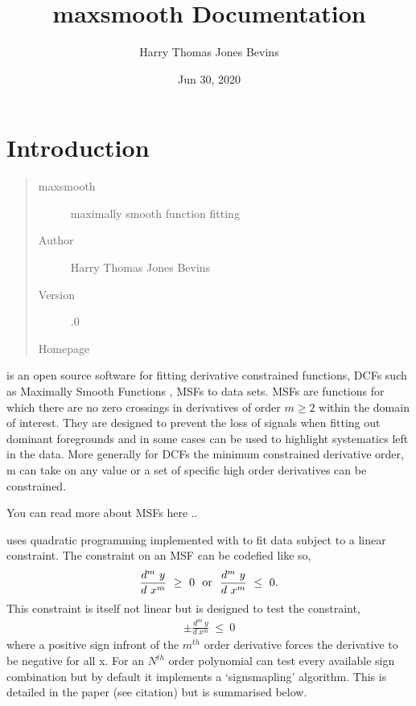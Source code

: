 \documentclass[letterpaper,10pt,english]{sphinxmanual}
\title{maxsmooth Documentation}
\date{Jun 30, 2020}
\author{Harry Thomas Jones Bevins}
\begin{document}
\pagestyle{empty}
\sphinxmaketitle
\pagestyle{plain}
\sphinxtableofcontents
\pagestyle{normal}
\label{\detokenize{source/index::doc}}



\chapter{Introduction}
\label{\detokenize{source/intro:introduction}}\begin{quote}\begin{description}
\item[{maxsmooth}] \leavevmode
maximally smooth function fitting

\item[{Author}] \leavevmode
Harry Thomas Jones Bevins

\item[{Version}] .0

\item[{Homepage}] \leavevmode
{}

\end{description}\end{quote}

 is an open source software for fitting derivative constrained
functions, DCFs such as Maximally Smooth Functions
, MSFs to data sets. MSFs are functions for which there are no zero
crossings in derivatives of order \(m \geq 2\) within the domain of interest.
They are designed to prevent the loss of
signals when fitting out dominant foregrounds and in some cases can be used to
highlight systematics left in the data. More generally for DCFs the minimum
constrained derivative order, m can take on any value or a set of
specific high order derivatives can be constrained.

You can read more about MSFs here ..

 uses quadratic programming implemented with  to fit
data subject to a linear constraint. The constraint on an MSF can be codefied
like so,
\begin{equation*}
\begin{split}\frac{d^m~y}{d~x^m}~\geq~0~~\textnormal{or}~~\frac{d^m~y}{d~x^m}~\leq~0.\end{split}
\end{equation*}
This constraint is itself not linear but  is designed to test the
constraint,
\begin{equation*}
\begin{split}\pm \frac{d^m~y}{d~x^m}~\leq~0\end{split}
\end{equation*}
where a positive sign infront of the \(m^{th}\) order derivative forces the derivative
to be negative for all x. For an \(N^{th}\) order polynomial  can test
every available sign combination but by default it implements a ‘sign\sphinxhyphen{}smapling’
algorithm. This is detailed in the  paper (see citation) but is summarised
below.
\end{document}
